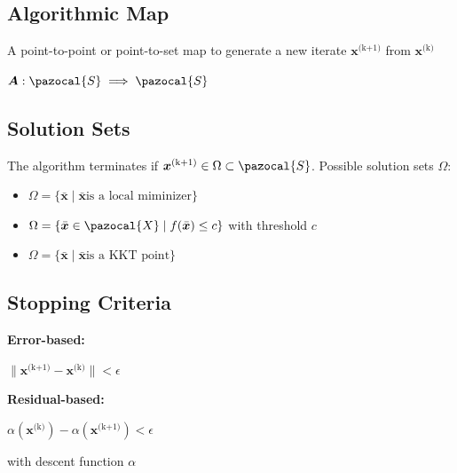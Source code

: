 \documentclass[english]{latex4ei/latex4ei_sheet}
\begin{document}
\begin{sectionbox}
	\subsection{Algorithmic Map}
	A point-to-point or point-to-set map to generate a new iterate $\bm{x}^{\text{(k+1)}}$ from $\bm{x}^{\text{(k)}}$ \\
	\begin{center}
		$\bm{A} : \pazocal{S} \implies \pazocal{S}$
	\end{center}
	\vspace{0.5em}
	
	\subsection{Solution Sets}
	The algorithm terminates if $\bm{x}^{\text{(k+1)}} \in \Omega \subset \pazocal{S}$. Possible solution sets $\Omega$:
	\begin{itemize}
		\item[] $\Omega = \{\bar{\bm{x}} \mid \bar{\bm{x}} \text{is a local miminizer} \}$
		\item[] $\Omega = \{\bar{\bm{x}} \in \pazocal{X} \mid f(\bar{\bm{x}}) \leq c \}$ with threshold $c$
		\item[] $\Omega = \{\bar{\bm{x}} \mid \bar{\bm{x}} \text{is a KKT point}\}$
	\end{itemize}
	\vspace{0.5em}

	\subsection{Stopping Criteria}
	\textbf{Error-based:}
	\begin{center}
		$\|\bm{x}^{\text{(k+1)}} - \bm{x}^{\text{(k)}} \| < \epsilon$
	\end{center}
	\textbf{Residual-based:}
	\begin{center}
		$\alpha(\bm{x}^{\text{(k)}}) - \alpha(\bm{x}^{\text{(k+1)}}) < \epsilon$
	\end{center}
	with descent function $\alpha$
	\vspace{0.5em}
	

\end{sectionbox}
\end{document}
